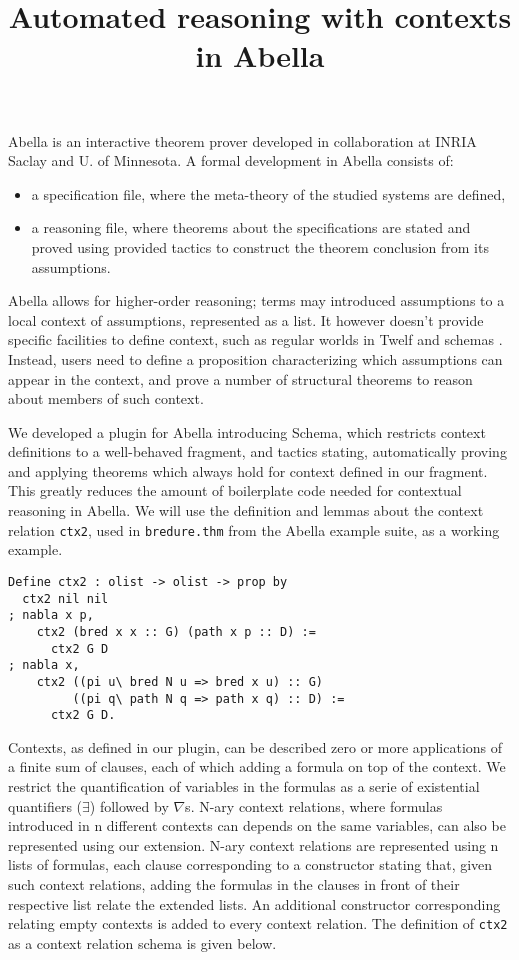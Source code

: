 \documentclass[nocopyrightspace,authoryear]{sigplanconf}
\title{Automated reasoning with contexts in Abella}
\begin{document}
\maketitle
Abella \cite{abellasys} is an interactive theorem prover developed in collaboration at INRIA Saclay and U. of Minnesota. A formal development in Abella consists of:
\begin{itemize}
\item a specification file, where the meta-theory of the studied systems are defined,
\item a reasoning file, where theorems about the specifications are stated and proved using provided tactics to construct the theorem conclusion from its assumptions.
\end{itemize}

Abella allows for higher-order reasoning; terms may introduced assumptions to a local context of assumptions, represented as a list. It however doesn't provide specific facilities to define context, such as regular worlds in Twelf \cite{twelfsys} and schemas \cite{belugasys}. Instead, users need to define a proposition characterizing which assumptions can appear in the context, and prove a number of structural theorems to reason about members of such context.


We developed a plugin for Abella introducing Schema, which restricts context definitions to a well-behaved fragment, and tactics stating, automatically proving and applying theorems which always hold for context defined in our fragment. This greatly reduces the amount of boilerplate code needed for contextual reasoning in Abella. We will use the definition and lemmas about the context relation \lstinline|ctx2|, used in \lstinline|bredure.thm| from the Abella example suite,  as a working example.

\begin{lstlisting}
Define ctx2 : olist -> olist -> prop by
  ctx2 nil nil
; nabla x p,
    ctx2 (bred x x :: G) (path x p :: D) := 
      ctx2 G D
; nabla x,
    ctx2 ((pi u\ bred N u => bred x u) :: G)
         ((pi q\ path N q => path x q) :: D) :=
      ctx2 G D.
\end{lstlisting}

Contexts, as defined in our plugin, can be described zero or more applications of a finite sum of clauses, each of which adding a formula on top of the context. We restrict the quantification of variables in the formulas as a serie of existential quantifiers ($\exists$) followed by $\nabla$s. N-ary context relations, where formulas introduced in  n different contexts can depends on the same variables, can also be represented using our extension. N-ary context relations are represented using n lists of formulas, each clause corresponding to a constructor stating that, given such context relations, adding the formulas in the clauses in front of their respective list relate the extended lists. An additional constructor corresponding relating empty contexts is added to every context relation. The definition of \lstinline|ctx2| as a context relation schema is given below.
\end{document}
